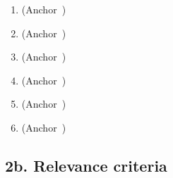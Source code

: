 
\begin{enumerate}
  \item \underline{\hspace{12cm}} \quad (Anchor~\underline{\hspace{0.4cm}})
  \vspace{0.2cm}
  \item \underline{\hspace{12cm}} \quad (Anchor~\underline{\hspace{0.4cm}})
  \vspace{0.2cm}
  \item \underline{\hspace{12cm}} \quad (Anchor~\underline{\hspace{0.4cm}})
  \vspace{0.2cm}
  \item \underline{\hspace{12cm}} \quad (Anchor~\underline{\hspace{0.4cm}})
  \vspace{0.2cm}
  \item \underline{\hspace{12cm}} \quad (Anchor~\underline{\hspace{0.4cm}})
  \vspace{0.2cm}
  \item \underline{\hspace{12cm}} \quad (Anchor~\underline{\hspace{0.4cm}})
\end{enumerate}

\subsection*{2b. Relevance criteria}


